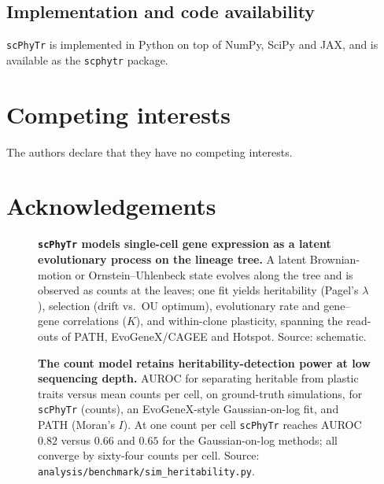 \documentclass{article}
\newcommand{\scphytr}{\texttt{scPhyTr}}
\begin{document}
\subsection*{Implementation and code availability}
\scphytr{} is implemented in Python on top of NumPy, SciPy and JAX, and is available as the
\texttt{scphytr} package. %

\section*{Competing interests}
The authors declare that they have no competing interests.

\section*{Acknowledgements}




\begin{figure}[t]
  \centering
  \caption{\textbf{\scphytr{} models single-cell gene expression as a latent evolutionary
  process on the lineage tree.} A latent Brownian-motion or Ornstein--Uhlenbeck state
  evolves along the tree and is observed as counts at the leaves; one fit yields
  heritability (Pagel's $\lambda$), selection (drift vs.\ OU optimum), evolutionary rate and
  gene--gene correlations ($K$), and within-clone plasticity, spanning the read-outs of
  PATH, EvoGeneX/CAGEE and Hotspot. Source: schematic.}
  \label{fig:overview}
\end{figure}

\begin{figure}[t]
  \centering
  \caption{\textbf{The count model retains heritability-detection power at low sequencing
  depth.} AUROC for separating heritable from plastic traits versus mean counts per cell, on
  ground-truth simulations, for \scphytr{} (counts), an EvoGeneX-style Gaussian-on-log fit,
  and PATH (Moran's $I$). At one count per cell \scphytr{} reaches AUROC $0.82$ versus
  $0.66$ and $0.65$ for the Gaussian-on-log methods; all converge by sixty-four counts per
  cell. Source: \texttt{analysis/benchmark/sim\_heritability.py}.}
  \label{fig:depth}
\end{figure}
\end{document}
